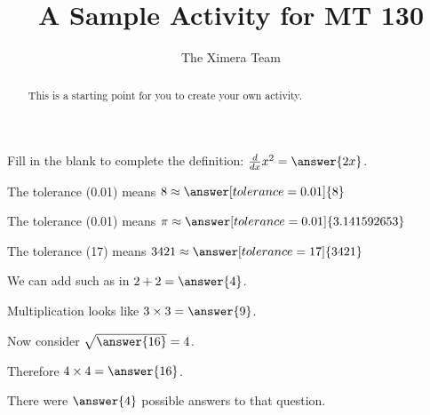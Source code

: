 \documentclass{ximera}
\title{A Sample Activity for MT 130}
\author{The Ximera Team}
\begin{document}
\begin{abstract}
This is a starting point for you to create your own activity.
\end{abstract}

\maketitle

\begin{problem}
    Fill in the blank to complete the definition: $\frac{d}{dx}x^2=\answer{2x}$.
\end{problem}

\begin{problem}
   The tolerance (0.01) means $8 \approx \answer[tolerance=0.01]{8}$
\end{problem}

 \begin{problem}
   The tolerance (0.01) means $\pi \approx \answer[tolerance=0.01]{3.141592653}$
 \end{problem}

 \begin{problem}
   The tolerance (17) means $3421 \approx \answer[tolerance=17]{3421}$
 \end{problem}


 \begin{problem}
   We can add such as in $2 + 2 = \answer{4}$.
   \begin{problem}
     Multiplication looks like $3 \times 3 = \answer{9}$.
     \begin{problem}
       Now consider $\sqrt{\answer{16}} = 4$.
       \begin{problem}
         Therefore $4 \times 4 = \answer{16}$.
       \end{problem}
     \end{problem}
   \end{problem}
   \end{problem}

\begin{problem}
  \begin{multipleChoice}
   \end{multipleChoice}

   \begin{problem}
     There were $\answer{4}$ possible answers to that question.

     \begin{problem}
       \begin{multipleChoice}
       \end{multipleChoice}
     \end{problem}
   \end{problem}
\end{problem}
\end{document}
